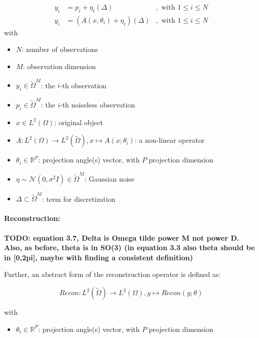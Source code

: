 \begin{equation}
    \label{eq:abstract-model}
    \begin{aligned}
        y_i &= p_i + \eta_i (\Delta) &, \text{ with } 1 \leq i \leq N \\
        y_i &= \left( A(x, \theta_i) + \eta_i \right) (\Delta) &, \text{ with } 1 \leq i \leq N 
    \end{aligned}
\end{equation}
with
\begin{itemize}
    \item $N$: number of observations
    \item $M$: observation dimension
    \item $y_i \in \tilde{\Omega}^M$: the $i$-th observation
    \item $p_i \in \tilde{\Omega}^M$: the $i$-th noiseless observation
    \item $x \in L^2(\Omega)$: original object
    \item $A: L^2(\Omega) \to L^2(\tilde{\Omega}), x \mapsto A(x; \theta_i)$: a non-linear operator 
    \item $\theta_i \in \mathbb{R}^P$: projection angle(s) vector, with $P$ projection dimension
    \item $\eta \sim \mathcal{N}(0, \sigma^2 I) \in \tilde{\Omega}^M$: Gaussian noise
    \item $\Delta \subset \tilde{\Omega}^{M}$: term for discretization
\end{itemize}

\paragraph{Reconstruction:}
\textbf{TODO: 
equation 3.7, Delta is Omega tilde power M not power D.
Also, as before, theta is in SO(3) (in equation 3.3 also theta should be in [0,2pi], maybe with finding a consistent definition)}


Further, an abstract form of the reconstruction operator is defined as:

\begin{equation}
    \textit{Recon} : L^2(\tilde{\Omega}) \to L^2(\Omega), y \mapsto Recon(y; \theta)
\end{equation}

with
\begin{itemize}
    \item $\theta_i \in \mathbb{R}^P$: projection angle(s) vector, with $P$ projection dimension
\end{itemize}

